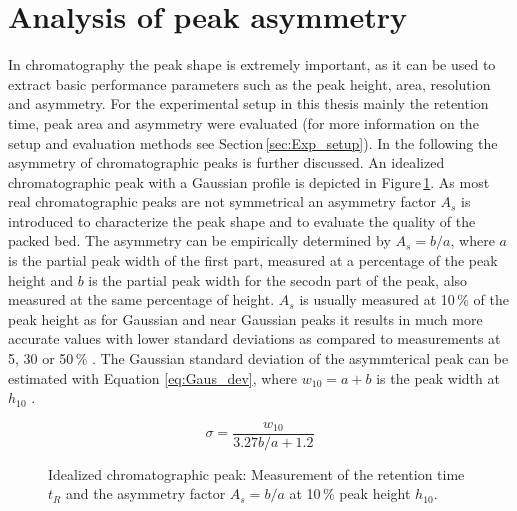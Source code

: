 \section{Analysis of peak asymmetry}
\label{sec:peak_as}
In chromatography the peak shape is extremely important, as it can be used to extract basic performance parameters such as the peak height, area, resolution and asymmetry. For the experimental setup in this thesis mainly the retention time, peak area and asymmetry were evaluated (for more information on the setup and evaluation methods see Section\,\ref{sec:Exp_setup}). In the following the asymmetry of chromatographic peaks is further discussed. \newline 
An idealized chromatographic peak with a Gaussian profile is depicted in Figure\,\ref{fig:peak_param}. As most real chromatographic peaks are not symmetrical an asymmetry factor $A_{s}$ is introduced to characterize the peak shape and to evaluate the quality of the packed bed. The asymmetry can be empirically determined by $A_{s}=b/a$, where $a$ is the partial peak width of the first part, measured at a percentage of the peak height and $b$ is the partial peak width for the secodn part of the peak, also measured at the same percentage of height. $A_{s}$ is usually measured at 10\,\% of the peak height as for Gaussian and near Gaussian peaks it results in much more accurate values with lower standard deviations as compared to measurements at 5, 30 or 50\,\% \cite{foley1983equations}. The Gaussian standard deviation of the asymmterical peak can be estimated with Equation \ref{eq:Gaus_dev}, where $w_{10}=a+b$ is the peak width at $h_{10}$ \cite{papai2002analysis}.  

\begin{equation}
\sigma=\frac{w_{10}}{3.27 b/a + 1.2}
\label{eq:Gaus_dev}
\end{equation}

\begin{figure}[h]
\centering
{}
\caption[Idealized chromatographic peak]{Idealized chromatographic peak: Measurement of the retention time $t_{R}$ and the asymmetry factor $A_{s}=b/a$ at 10\,\% peak height $h_{10}$.  
\label{fig:peak_param}
}
\end{figure}

